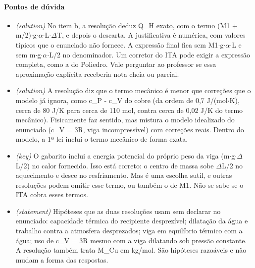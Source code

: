 \documentclass{article}%
\begin{document}
\paragraph{Pontos de dúvida}%
\begin{itemize}%
\item%
\textit{(solution)} No item b, a resolução deduz Q\_H exato, com o termo (M1 + m/2)$\cdot$g$\cdot$$\alpha$$\cdot$L$\cdot$$\Delta$T, e depois o descarta. A justificativa é numérica, com valores típicos que o enunciado não fornece. A expressão final fica sem M1$\cdot$g$\cdot$$\alpha$$\cdot$L e sem m$\cdot$g$\cdot$$\alpha$$\cdot$L/2 no denominador. Um corretor do ITA pode exigir a expressão completa, como a do Poliedro. Vale perguntar ao professor se essa aproximação explícita receberia nota cheia ou parcial.%
\item%
\textit{(solution)} A resolução diz que o termo mecânico é menor que correções que o modelo já ignora, como c\_P - c\_V do cobre (da ordem de 0,7 J/(mol$\cdot$K), cerca de 80 J/K para cerca de 110 mol, contra cerca de 0,02 J/K do termo mecânico). Fisicamente faz sentido, mas mistura o modelo idealizado do enunciado (c\_V = 3R, viga incompressível) com correções reais. Dentro do modelo, a 1ª lei inclui o termo mecânico de forma exata.%
\item%
\textit{(key)} O gabarito inclui a energia potencial do próprio peso da viga (m$\cdot$g$\cdot$$\Delta$L/2) no calor fornecido. Isso está correto: o centro de massa sobe $\Delta$L/2 no aquecimento e desce no resfriamento. Mas é uma escolha sutil, e outras resoluções podem omitir esse termo, ou também o de M1. Não se sabe se o ITA cobra esses termos.%
\item%
\textit{(statement)} Hipóteses que as duas resoluções usam sem declarar no enunciado: capacidade térmica do recipiente desprezível; dilatação da água e trabalho contra a atmosfera desprezados; viga em equilíbrio térmico com a água; uso de c\_V = 3R mesmo com a viga dilatando sob pressão constante. A resolução também trata M\_Cu em kg/mol. São hipóteses razoáveis e não mudam a forma das respostas.%
\end{itemize}%
\end{document}
